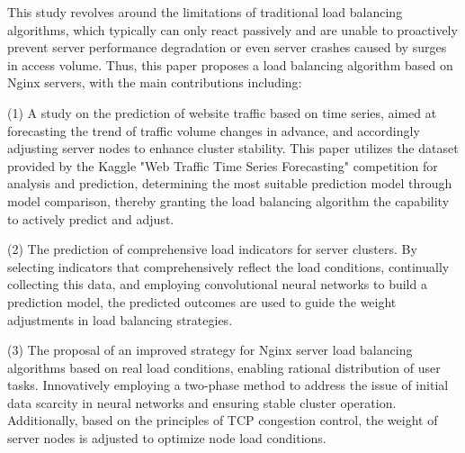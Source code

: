 \begin{eabstract}

	This study revolves around the limitations of traditional load balancing algorithms, which typically can only react passively and are unable to proactively prevent server performance degradation or even server crashes caused by surges in access volume. Thus, this paper proposes a load balancing algorithm based on Nginx servers, with the main contributions including:

	(1) A study on the prediction of website traffic based on time series, aimed at forecasting the trend of traffic volume changes in advance, and accordingly adjusting server nodes to enhance cluster stability. This paper utilizes the dataset provided by the Kaggle "Web Traffic Time Series Forecasting" competition for analysis and prediction, determining the most suitable prediction model through model comparison, thereby granting the load balancing algorithm the capability to actively predict and adjust.

	(2) The prediction of comprehensive load indicators for server clusters. By selecting indicators that comprehensively reflect the load conditions, continually collecting this data, and employing convolutional neural networks to build a prediction model, the predicted outcomes are used to guide the weight adjustments in load balancing strategies.

	(3) The proposal of an improved strategy for Nginx server load balancing algorithms based on real load conditions, enabling rational distribution of user tasks. Innovatively employing a two-phase method to address the issue of initial data scarcity in neural networks and ensuring stable cluster operation. Additionally, based on the principles of TCP congestion control, the weight of server nodes is adjusted to optimize node load conditions.

\end{eabstract}

